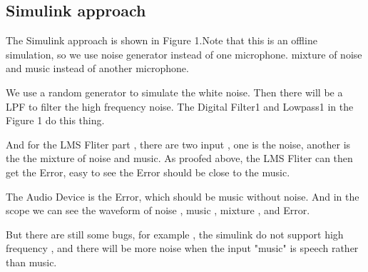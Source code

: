 \documentclass[conference,compsoc]{IEEEtran}
\begin{document}
\subsection{Simulink approach}
The Simulink approach is shown in Figure 1.Note that this is an offline simulation, so we use noise generator instead of one microphone. mixture of noise and music instead of another microphone.
\par
We use a random generator to simulate the white noise. Then there will be a LPF to filter the high frequency noise. The Digital Filter1 and Lowpass1 in the Figure 1 do this thing.
\par
And for the LMS Fliter part , there are two input , one is the noise, another is the the mixture of noise and music. As proofed above, the LMS Fliter can then get the Error, easy to see the Error should be close to the music.
\par
The Audio Device is the Error, which should be music without noise. And in the scope we can see the waveform of noise , music , mixture , and Error.
\par
But there are still some bugs, for example , the simulink do not support high frequency , and there will be more noise when the input "music" is speech rather than music.
\end{document}
